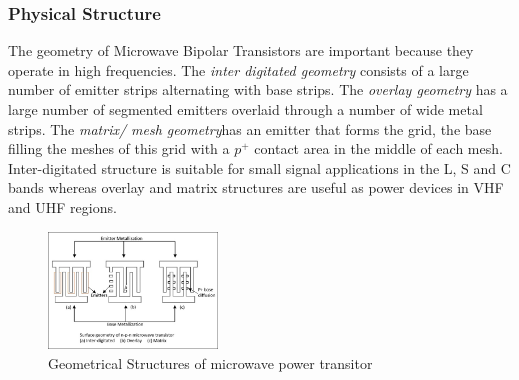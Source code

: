 \begin{frame}
  \frametitle{Physical Structure}

  The geometry of Microwave Bipolar Transistors are important because they operate in high frequencies. The \emph{inter digitated geometry} consists of a large number of emitter strips alternating with base strips. The \emph{overlay geometry} has a large number of segmented emitters overlaid through a number of wide metal strips. The \emph{matrix/ mesh geometry}has an emitter that forms the grid, the base filling the meshes of this grid with a $p^+$ contact area in the middle of each mesh.
  Inter-digitated structure is suitable for small signal applications in the L, S and C bands whereas overlay and matrix structures are useful as power devices in VHF and UHF regions.
\end{frame}

\begin{frame}
  \begin{figure}[h]
    \caption{Geometrical Structures of microwave power transitor}
    \centering
    \includegraphics[width=0.4\textwidth]{./images/chapter9/fig9_1.png}
  \end{figure}
\end{frame}